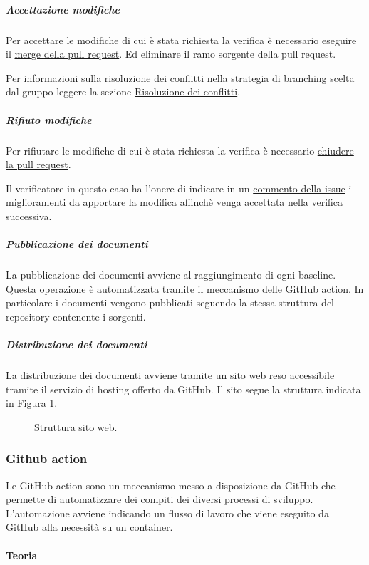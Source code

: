 \subparagraph{Accettazione modifiche}
\label{subpar:accettazione_modifiche}
Per accettare le modifiche di cui è stata richiesta la verifica è necessario eseguire il \hyperref[item:approvazione_pull_request]{merge della pull request}.
Ed eliminare il ramo sorgente della pull request.

Per informazioni sulla risoluzione dei conflitti nella strategia di branching scelta dal gruppo leggere la sezione \hyperref[subpar:risoluzione_dei_conflitti]{Risoluzione dei conflitti}.


\subparagraph{Rifiuto modifiche}
\label{subpar:rifiuto_modifiche}
Per rifiutare le modifiche di cui è stata richiesta la verifica è necessario \hyperref[item:chiusura_pull_request]{chiudere la pull request}.

Il verificatore in questo caso ha l'onere di indicare in un \hyperref[item:commentare_issue]{commento della issue} i miglioramenti da apportare la modifica affinchè venga accettata nella verifica successiva.

\subparagraph{Pubblicazione dei documenti}
La pubblicazione dei documenti avviene al raggiungimento di ogni baseline.
Questa operazione è automatizzata tramite il meccanismo delle \hyperref[subsebsec:github_action]{GitHub action}.
In particolare i documenti vengono pubblicati seguendo la stessa struttura del repository contenente i sorgenti.

\subparagraph{Distribuzione dei documenti}
La distribuzione dei documenti avviene tramite un sito web reso accessibile tramite il servizio di hosting offerto da GitHub.
Il sito segue la struttura indicata in \hyperref[fig:sito_docs]{Figura \ref{fig:sito_docs}}.

\begin{figure}[!h]
\caption{Struttura sito web.}
\label{fig:sito_docs}
\end{figure}

\subsubsection{Github action}
Le GitHub action sono un meccanismo messo a disposizione da GitHub che permette di automatizzare dei compiti dei diversi processi di sviluppo.
L'automazione avviene indicando un flusso di lavoro che viene eseguito da GitHub alla necessità su un container.

\paragraph{Teoria}

